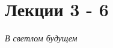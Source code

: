 


    
    \newpage
    \hypertarget{intro}{}
    \tableofcontents
    \newpage
    
    
    
    
    
    \section{Лекции 3 - 6}
    \textit{В светлом будущем}
        
    
    \newpage
    
